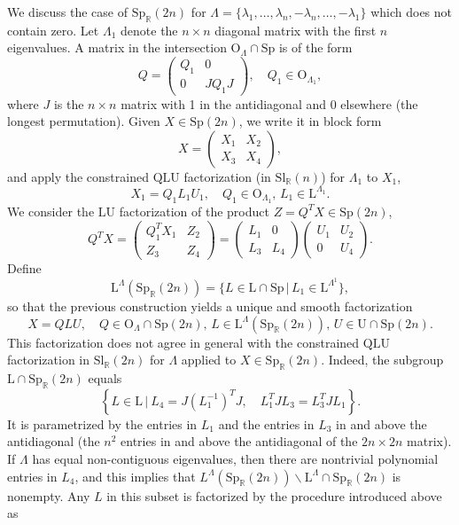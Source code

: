 \documentclass[reqno]{amsart}
\newcommand{\R}{\mathbb{R}}
\newcommand{\Sl}{\mathrm{Sl}}
\newcommand{\Sp}{\mathrm{Sp}}
\renewcommand{\L}{\mathrm{L}}
\newcommand{\U}{\mathrm{U}}
\theoremstyle{definition} %
\begin{document}
\begin{enumerate}[(i)]
 We discuss the case of $\mathrm{Sp}_\R(2n)$ for $\Lambda=\{\lambda_1,\dots, \lambda_n,-\lambda_n,\dots,-\lambda_1\}$ which does  not contain zero. Let $\Lambda_1$ denote the $n\times n$ diagonal matrix with the first $n$ eigenvalues. A matrix in the intersection
 $\mathrm{O}_\Lambda\cap \Sp$ is of the form
 \[Q=\begin{pmatrix} Q_1 & 0 \\ 0 & J Q_1 J\end{pmatrix},\quad Q_1\in \mathrm{O}_{\Lambda_1},\]
 where $J$ is the $n\times n$ matrix with 1 in the antidiagonal and 0 elsewhere (the longest permutation). Given $X\in \Sp(2n)$, we write it in block form
 \[X=\begin{pmatrix} X_1 & X_2 \\ X_3 & X_4\end{pmatrix},\]
and apply the constrained $\mathrm{QLU}$ factorization (in $\Sl_\R(n)$) for $\Lambda_1$ to $X_1$,
\[X_1=Q_1L_1U_1,\quad Q_1\in \mathrm{O}_{\Lambda_1},\,L_1\in \L^{\Lambda_1}.\]
We consider the $\L\U$ factorization of the  product $Z=Q^TX\in \Sp(2n)$,
\[Q^TX=\begin{pmatrix} Q_1^T X_1 & Z_2 \\
        Z_3 & Z_4
       \end{pmatrix}=\begin{pmatrix} L_1 & 0 \\ L_3 & L_4\end{pmatrix} \begin{pmatrix} U_1 & U_2 \\ 0 & U_4\end{pmatrix}.
       \]
Define \[\L^\Lambda(\Sp_\R(2n))=\{L\in \L\cap \Sp\,|\,L_1\in \L^{\Lambda^1}\},\]
so that the previous construction yields a unique and smooth factorization
\[X=QLU,\quad Q\in \mathrm{O}_{\Lambda}\cap \Sp(2n), \, L\in \L^\Lambda(\Sp_\R(2n)),\, U\in \U\cap \Sp(2n).\]
This factorization does not agree in general with the constrained $\mathrm{QLU}$ factorization in $\Sl_\R(2n)$ for $\Lambda$ applied to $X\in \Sp_\R(2n)$. Indeed, the subgroup $\L\cap \Sp_\R(2n)$ equals
\[\left\{ L\in \L\,|\ L_4=J{\left(L_1^{-1}\right)}^TJ,\quad L_1^TJL_3=L_3^TJL_1\right\}.\]
It is parametrized by the entries in $L_1$ and the entries in $L_3$ in and above the antidiagonal (the $n^2$ entries in and above the antidiagonal of the $2n \times 2n$ matrix).
If $\Lambda$ has equal  non-contiguous eigenvalues, then there are nontrivial polynomial entries in $L_4$, and this implies that $L^\Lambda(\Sp_\R(2n))\backslash \L^\Lambda\cap \Sp_\R(2n)$ is nonempty. Any $L$ in this subset is factorized by the procedure introduced above as

\end{enumerate}
\end{document}
